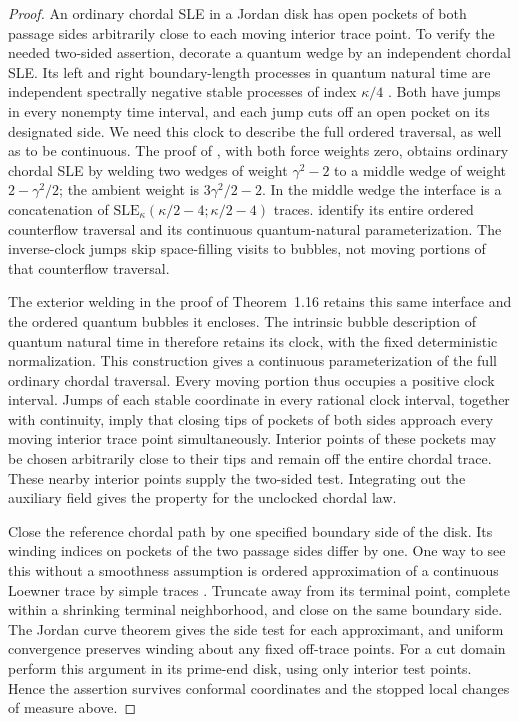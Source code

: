 \begin{proof}
An ordinary chordal SLE in a Jordan disk has open pockets of both
passage sides arbitrarily close to each moving interior trace point.
To verify the needed two-sided assertion, decorate a quantum wedge by
an independent chordal SLE.  Its left and right boundary-length
processes in quantum natural time are independent spectrally negative
stable processes of index $\kappa/4$
\cite[Theorem~10.1]{DMSMating}.  Both have jumps in every nonempty time
interval, and each jump cuts off an open pocket on its designated side.
We need this clock to describe the full ordered traversal, as well
as to be continuous.  The proof of \cite[Theorem~1.16]{DMSMating},
with both force weights zero, obtains ordinary chordal SLE by welding
two wedges of weight $\gamma^2-2$ to a middle wedge of weight
$2-\gamma^2/2$; the ambient weight is $3\gamma^2/2-2$.
In the middle wedge the interface is a concatenation of
$\mathrm{SLE}_{\kappa}(\kappa/2-4;\kappa/2-4)$ traces.
 identify its entire
ordered counterflow traversal and its continuous quantum-natural
parameterization.  The inverse-clock jumps skip space-filling visits
to bubbles, not moving portions of that counterflow traversal.

The exterior welding in the proof of Theorem~1.16 retains this same
interface and the ordered quantum bubbles it encloses.  The intrinsic
bubble description of quantum natural time in
\cite[Theorem~6.22, Definition~6.23 and Remark~10.5]{DMSMating}
therefore retains its clock, with the fixed deterministic normalization.
This construction gives a continuous parameterization of the full
ordinary chordal traversal.  Every moving portion thus occupies a
positive clock interval.  Jumps of each stable coordinate in every
rational clock interval, together with continuity, imply that closing
tips of pockets of both sides approach every moving interior trace
point simultaneously.  Interior points of these pockets may be chosen
arbitrarily close to their tips and remain off the entire chordal
trace.  These nearby interior points supply the two-sided test.
Integrating out the auxiliary field
gives the property for the unclocked chordal law.

Close the reference chordal path by one specified boundary side of the
disk.  Its winding indices on pockets of the two passage sides differ
by one.  One way to see this without a smoothness assumption is ordered
approximation of a continuous Loewner trace by simple traces
\cite[Theorem~1.1]{YuanLoewnerTraces}.  Truncate away from its terminal
point, complete within a shrinking terminal neighborhood, and close
on the same boundary side.  The Jordan curve theorem gives the side
test for each approximant, and uniform convergence preserves winding
about any fixed off-trace points.  For a cut domain perform this argument
in its prime-end disk, using only interior test points.  Hence the
assertion survives conformal coordinates and the stopped local changes
of measure above.


\end{proof}
